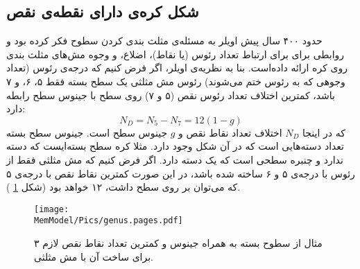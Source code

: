 \setRL



\subsection{
شکل کره‌ی دارای نقطه‌ی نقص
}
حدود ۴۰۰ سال پیش اویلر به مسئله‌ی مثلث بندی کردن سطوح فکر کرده بود و روابطی برای برای ارتباط تعداد رئوس (یا نقاط)، اضلاع، و وجوه مش‌های مثلث بندی روی کره ارائه داده‌است.  بنا به نظریه‌ی اویلر، اگر فرض کنیم که درجه‌ی رئوس (تعداد وجوهی که به رئوس ختم می‌شوند) رئوس مش مثلثی یک سطح بسته فقط ۵، ۶، و ۷ باشد، کمترین اختلاف تعداد رئوس نقص (۵ و ۷) روی سطح با جینوس سطح رابطه دارد:
\begin{equation}
N_D=N_5-N_7=12(1-g)
\label{eq:genus}
\end{equation}
که در اینجا
$N_D$
اختلاف تعداد نقاط نقص و 
$g$
جینوس
 سطح است. جینوس سطح بسته تعداد دسته‌هایی است که در آن شکل وجود دارد. مثلا کره سطح بسته‌ایست که دسته ندارد و چنبره سطحی است که یک دسته دارد. اگر فرض کنیم که مش مثلثی‌ فقط از رئوس با درجه‌ی ۵ و ۶ ساخته شده باشد، در این صورت کمترین نقاط نقص با درجه‌ی ۵ که می‌توان بر روی سطح داشت، ۱۲ خواهد بود (شکل
 \ref{fig:genus}
 ).
\begin{figure}[h]
\begin{center}
\texttt{[image: \\MemModel/Pics/genus.pages.pdf]}
\caption{
۳ مثال از سطوح بسته به همراه جینوس و کمترین تعداد نقاط نقص لازم  برای ساخت آن با مش مثلثی.
}
\label{fig:genus}
\end{center}
\end{figure}


